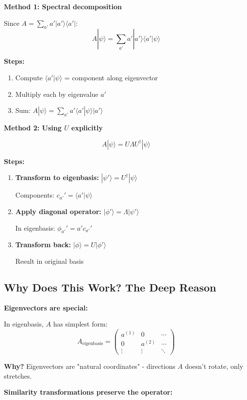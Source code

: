 \documentclass[11pt,a4paper]{article}
\begin{document}
\textbf{Method 1: Spectral decomposition}

Since $A = \sum_{a'} a' |a'\rangle\langle a'|$:
$$A|\psi\rangle = \sum_{a'} a' |a'\rangle\langle a'|\psi\rangle$$

\textbf{Steps:}
\begin{enumerate}
\item Compute $\langle a'|\psi\rangle$ = component along eigenvector
\item Multiply each by eigenvalue $a'$
\item Sum: $A|\psi\rangle = \sum_{a'} a' \langle a'|\psi\rangle |a'\rangle$
\end{enumerate}

\textbf{Method 2: Using $U$ explicitly}

$$A|\psi\rangle = U\Lambda U^\dagger|\psi\rangle$$

\textbf{Steps:}
\begin{enumerate}
\item \textbf{Transform to eigenbasis:} $|\psi'\rangle = U^\dagger|\psi\rangle$
   
   Components: $c_{a'}' = \langle a'|\psi\rangle$

\item \textbf{Apply diagonal operator:} $|\phi'\rangle = \Lambda|\psi'\rangle$
   
   In eigenbasis: $\phi_{a'}' = a' c_{a'}'$

\item \textbf{Transform back:} $|\phi\rangle = U|\phi'\rangle$
   
   Result in original basis
\end{enumerate}

\subsection*{Why Does This Work? The Deep Reason}

\textbf{Eigenvectors are special:}

In eigenbasis, $A$ has simplest form:
$$A_{\text{eigenbasis}} = \begin{pmatrix}
a^{(1)} & 0 & \cdots \\
0 & a^{(2)} & \cdots \\
\vdots & \vdots & \ddots
\end{pmatrix}$$

\textbf{Why?} Eigenvectors are "natural coordinates" - directions $A$ doesn't rotate, only stretches.

\textbf{Similarity transformations preserve the operator:}
\end{document}
